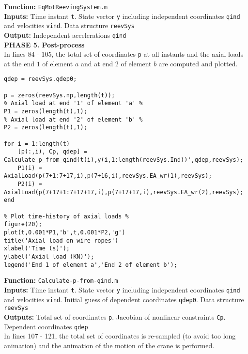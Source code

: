 \setlength{\parindent}{0cm}
\textbf{Function:} \texttt{EqMotReevingSystem.m} \\
\textbf{Inputs:} Time instant \texttt{t}. State vector \texttt{y} including independent coordinates \texttt{qind} and velocities \texttt{vind}. Data structure \texttt{reevSys} \\
\textbf{Output:} Independent accelerations \texttt{qind} \\

\textbf{PHASE 5. Post-process} \\

In lines 84 - 105, the total set of coordinates \texttt{p} at all instants and the axial loads at the end $1$ of element $a$ and at end $2$ of element $b$ are computed and plotted. 

{\begin{tcolorbox}\begin{lstlisting}[style=Matlab-editor]
% Calculation of all coordinates all instants %
qdep = reevSys.qdep0;

p = zeros(reevSys.np,length(t));
% Axial load at end '1' of element 'a' %
P1 = zeros(length(t),1);
% Axial load at end '2' of element 'b' %
P2 = zeros(length(t),1);

for i = 1:length(t)
    [p(:,i), Cp, qdep] = Calculate_p_from_qind(t(i),y(i,1:length(reevSys.Ind))',qdep,reevSys);
    P1(i) = AxialLoad(p(7+1:7+17,i),p(7+16,i),reevSys.EA_wr(1),reevSys); 
    P2(i) = AxialLoad(p(7+17+1:7+17+17,i),p(7+17+17,i),reevSys.EA_wr(2),reevSys); 
end

% Plot time-history of axial loads %
figure(20);
plot(t,0.001*P1,'b',t,0.001*P2,'g')
title('Axial load on wire ropes')
xlabel('Time (s)');
ylabel('Axial load (KN)');
legend('End 1 of element a','End 2 of element b');
\end{lstlisting}\end{tcolorbox}}


\setlength{\parindent}{0cm}
\textbf{Function:} \texttt{Calculate-p-from-qind.m} \\
\textbf{Inputs:} Time instant \texttt{t}. State vector \texttt{y} including independent coordinates \texttt{qind} and velocities \texttt{vind}. Initial guess of dependent coordinates \texttt{qdep0}. Data structure \texttt{reevSys} \\
\textbf{Outputs:} Total set of coordinates \texttt{p}. Jacobian of nonlinear constraints \texttt{Cp}. Dependent coordinates \texttt{qdep} \\

In lines 107 - 121, the total set of coordinates is re-sampled (to avoid too long animation) and the animation of the motion of the crane is performed.

